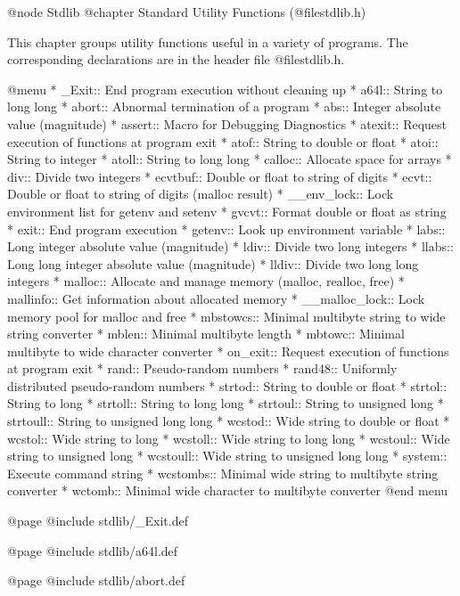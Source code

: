 @node Stdlib
@chapter Standard Utility Functions (@file{stdlib.h})

This chapter groups utility functions useful in a variety of programs.
The corresponding declarations are in the header file @file{stdlib.h}.

@menu 
* _Exit::       End program execution without cleaning up
* a64l::        String to long long
* abort::       Abnormal termination of a program
* abs::         Integer absolute value (magnitude)
* assert::      Macro for Debugging Diagnostics
* atexit::      Request execution of functions at program exit
* atof::        String to double or float
* atoi::        String to integer
* atoll::       String to long long
* calloc::      Allocate space for arrays
* div::         Divide two integers
* ecvtbuf::     Double or float to string of digits
* ecvt::        Double or float to string of digits (malloc result)
* __env_lock::		Lock environment list for getenv and setenv
* gvcvt::       Format double or float as string
* exit::        End program execution
* getenv::      Look up environment variable
* labs::        Long integer absolute value (magnitude)
* ldiv::        Divide two long integers
* llabs::       Long long integer absolute value (magnitude)
* lldiv::       Divide two long long integers
* malloc::      Allocate and manage memory (malloc, realloc, free)
* mallinfo::	Get information about allocated memory
* __malloc_lock::	Lock memory pool for malloc and free
* mbstowcs::	Minimal multibyte string to wide string converter
* mblen::	Minimal multibyte length
* mbtowc::      Minimal multibyte to wide character converter
* on_exit::     Request execution of functions at program exit
* rand::        Pseudo-random numbers
* rand48::      Uniformly distributed pseudo-random numbers
* strtod::      String to double or float
* strtol::      String to long
* strtoll::     String to long long
* strtoul::     String to unsigned long
* strtoull::    String to unsigned long long
* wcstod::      Wide string to double or float
* wcstol::      Wide string to long
* wcstoll::     Wide string to long long
* wcstoul::     Wide string to unsigned long
* wcstoull::    Wide string to unsigned long long
* system::      Execute command string
* wcstombs::	Minimal wide string to multibyte string converter
* wctomb::      Minimal wide character to multibyte converter
@end menu

@page
@include stdlib/_Exit.def

@page
@include stdlib/a64l.def

@page
@include stdlib/abort.def

